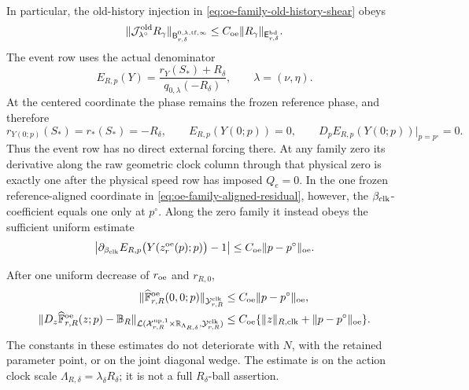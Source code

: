 \begin{theorem}
\begin{align}
\end{align}
In particular, the old-history injection in
\cref{eq:oe-family-old-history-shear} obeys
\begin{equation}
 \|\mathcal J_{\lambda^\circ}^{\rm old}R_\gamma\|_
  {\mathsf B_{r,\delta}^{0,\lambda,\mathrm{tf},\infty}}
 \le C_{\rm oe}\|R_\gamma\|_
       {\mathsf E_{r,\delta}^{\rm bd}}.          \label{eq:oe-family-old-injection-bound}
\end{equation}
The event row uses the actual denominator
\begin{equation}
 E_{R,p}(Y)=
   \frac{r_Y(S_*)+R_\delta}
        {q_{0,\lambda}(-R_\delta)},\qquad
 \lambda=(\nu,\eta).                            \label{eq:oe-family-actual-event-row}
\end{equation}
At the centered coordinate the phase remains the frozen reference phase,
and therefore
\begin{equation}
 r_{Y(0;p)}(S_*)=r_*(S_*)=-R_\delta,\qquad
 E_{R,p}(Y(0;p))=0,\qquad
 D_pE_{R,p}(Y(0;p))\big|_{p=p^\circ}=0.          \label{eq:oe-family-event-centering}
\end{equation}
Thus the event row has no direct external forcing there.  At any family
zero its derivative along the raw geometric clock column through that
physical zero is exactly one after the physical speed row has imposed
\(Q_e=0\).  In the one frozen reference-aligned coordinate in
\cref{eq:oe-family-aligned-residual}, however, the
\(\beta_{\rm clk}\)-coefficient equals one only at \(p^\circ\).  Along the
zero family it instead obeys the sufficient uniform estimate
\begin{equation}
 \left|\partial_{\beta_{\rm clk}}
 E_{R,p}\bigl(Y(z_r^{\rm oe}(p);p)\bigr)-1\right|
 \le C_{\rm oe}\|p-p^\circ\|_{\rm oe}.          \label{eq:oe-family-frozen-clock-coefficient}
\end{equation}

After one uniform decrease of \(r_{\rm oe}\) and \(r_{R,0}\),
\begin{align}
 \|\widehat{\mathbb F}_{r,R}^{\rm oe}(0,0;p)\|_
       {\mathcal Y_{r,R}^{\rm clk}}
 &\le C_{\rm oe}\|p-p^\circ\|_{\rm oe},         \label{eq:oe-family-base-forcing}\\
 \|D_z\widehat{\mathbb F}_{r,R}^{\rm oe}(z;p)
       -\mathbb B_R\|_{
       \mathcal L(\mathcal X_{r,R}^{\rm up,1}
          \times\mathbb R_{\Lambda_{R,\delta}},
          \mathcal Y_{r,R}^{\rm clk})}
 &\le C_{\rm oe}
       \{\|z\|_{R,\rm clk}+\|p-p^\circ\|_{\rm oe}\}.
                                                        \label{eq:oe-family-derivative-ledger}
\end{align}
The constants in these estimates do not deteriorate with \(N\), with the
retained parameter point, or on the joint diagonal wedge.  The estimate is
on the action clock scale
\(\Lambda_{R,\delta}=\lambda_\delta R_\delta\); it is not a full
\(R_\delta\)-ball assertion.


\end{theorem}
